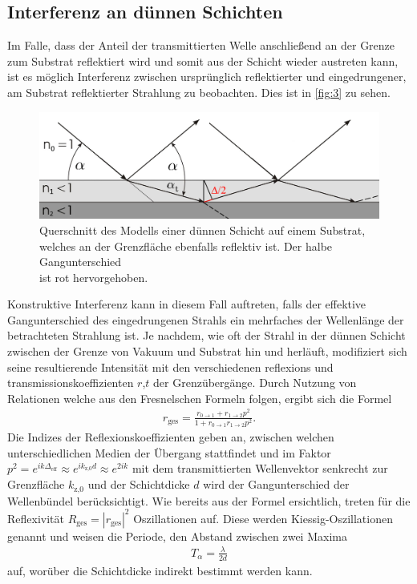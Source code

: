 \documentclass[12pt]{article}
\begin{document}
\subsection{Interferenz an dünnen Schichten}
Im Falle, dass der Anteil der transmittierten Welle anschließend an der Grenze zum Substrat reflektiert wird und somit aus der Schicht wieder austreten kann, ist es möglich Interferenz zwischen ursprünglich reflektierter und eingedrungener, am Substrat reflektierter Strahlung zu beobachten. Dies ist in \autoref{fig:3} zu sehen.
\begin{figure}[H]
  \centering
  \includegraphics[scale=0.3]{Ressourcen/schicht.png}
  \caption{Querschnitt des Modells einer dünnen Schicht auf einem Substrat,\\ welches an der Grenzfläche ebenfalls reflektiv ist. Der halbe Gangunterschied \\ ist rot hervorgehoben.}\label{fig:3}
\end{figure}
Konstruktive Interferenz kann in diesem Fall auftreten, falls der effektive Gangunterschied des eingedrungenen Strahls ein mehrfaches der Wellenlänge der betrachteten Strahlung ist.
Je nachdem, wie oft der Strahl in der dünnen Schicht zwischen der Grenze von Vakuum und Substrat hin und herläuft, modifiziert sich seine resultierende Intensität mit den verschiedenen reflexions und transmissionskoeffizienten $r$,$t$ der Grenzübergänge.
Durch Nutzung von Relationen welche aus den Fresnelschen Formeln folgen, ergibt sich die Formel
\begin{align}
  r_\text{ges}= \frac{r_{0\to1}+r_{1\to2}p^2}{1+r_{0\to1}r_{1\to2}p^2}\text{.}\label{eqn:schicht}
\end{align}
Die Indizes der Reflexionskoeffizienten geben an, zwischen welchen unterschiedlichen Medien der Übergang stattfindet und im Faktor $p^2=e^{ik\Delta_\text{eff}}\approx e^{ik_\text{z,0}d} \approx e^{2ik}$ mit dem transmittierten Wellenvektor senkrecht zur Grenzfläche $k_\text{z,0}$ und der Schichtdicke $d$ wird der Gangunterschied der Wellenbündel berücksichtigt.
Wie bereits aus der Formel ersichtlich, treten für die Reflexivität $R_\text{ges}=|r_\text{ges}|^2$ Oszillationen auf.
Diese werden Kiessig-Oszillationen genannt und weisen die Periode, den Abstand zwischen zwei Maxima 
\begin{align}
  T_\alpha = \frac{\lambda}{2d}
\end{align}
auf, worüber die Schichtdicke indirekt bestimmt werden kann.
\end{document}
